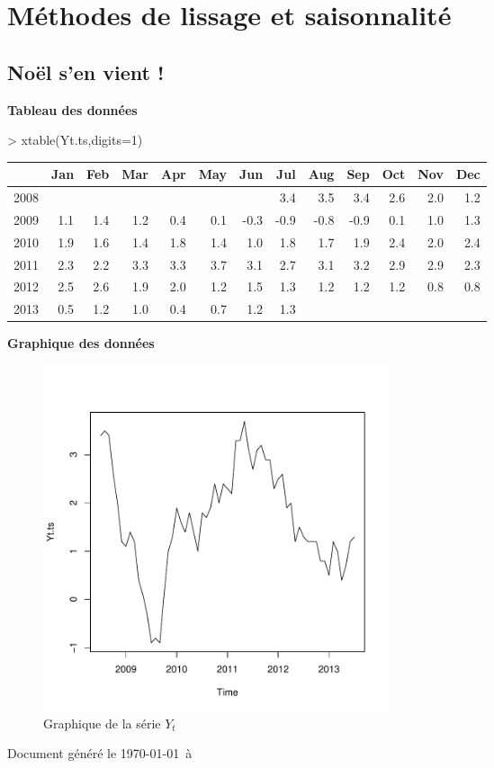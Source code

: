 \documentclass{article}
\begin{document}


\section{Méthodes de lissage et saisonnalité}
\label{sec:serie-dexercices-1}

\subsection{Noël s'en vient !}
\label{sec:exercice-1-1}


\textbf{Tableau des données}
\begin{Schunk}
\begin{Sinput}
> xtable(Yt.ts,digits=1)
\end{Sinput}
\begin{table}[ht]
\centering
\begin{tabular}{rrrrrrrrrrrrr}
  \hline
 & Jan & Feb & Mar & Apr & May & Jun & Jul & Aug & Sep & Oct & Nov & Dec \\ 
  \hline
2008 &  &  &  &  &  &  & 3.4 & 3.5 & 3.4 & 2.6 & 2.0 & 1.2 \\ 
  2009 & 1.1 & 1.4 & 1.2 & 0.4 & 0.1 & -0.3 & -0.9 & -0.8 & -0.9 & 0.1 & 1.0 & 1.3 \\ 
  2010 & 1.9 & 1.6 & 1.4 & 1.8 & 1.4 & 1.0 & 1.8 & 1.7 & 1.9 & 2.4 & 2.0 & 2.4 \\ 
  2011 & 2.3 & 2.2 & 3.3 & 3.3 & 3.7 & 3.1 & 2.7 & 3.1 & 3.2 & 2.9 & 2.9 & 2.3 \\ 
  2012 & 2.5 & 2.6 & 1.9 & 2.0 & 1.2 & 1.5 & 1.3 & 1.2 & 1.2 & 1.2 & 0.8 & 0.8 \\ 
  2013 & 0.5 & 1.2 & 1.0 & 0.4 & 0.7 & 1.2 & 1.3 &  &  &  &  &  \\ 
   \hline
\end{tabular}
\end{table}\end{Schunk}
\textbf{Graphique des données}
\begin{figure}[!ht]
  \centering
  \includegraphics[height=4in, width=4in]{exercice1-graph1.pdf}
  \caption{Graphique de la série $Y_t$}
  \label{fig:exercice1-graph1}
\end{figure}


\clearpage
Document généré le  \today  \ à \ \thistime
\end{document}
